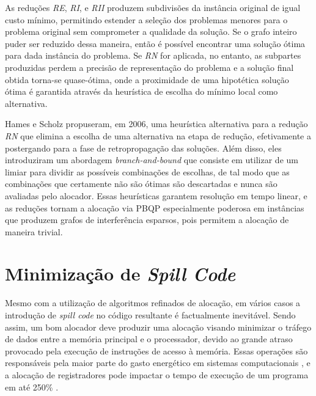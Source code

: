 \documentclass[
	12pt,				%
	openright,			%
	oneside,			%
	a4paper,			%
	tccpreliminar,			%
	]{ABNT-DC-UEL}
\begin{document}
\begin{enumerate}
\begin{figure}[H]
    \end{figure}
\end{enumerate}

As reduções \textit{RE}, \textit{RI}, e \textit{RII} produzem subdivisões da instância original de igual custo mínimo, permitindo estender a seleção dos problemas menores para o problema original sem comprometer a qualidade da solução. Se o grafo inteiro puder ser reduzido dessa maneira, então é possível encontrar uma solução ótima para dada instância do problema. Se \textit{RN} for aplicada, no entanto, as subpartes produzidas perdem a precisão de representação do problema e a solução final obtida torna-se quase-ótima, onde a proximidade de uma hipotética solução ótima é garantida através da heurística de escolha do mínimo local como alternativa.

Hames e Scholz \cite{hames:06} propuseram, em 2006, uma heurística alternativa para a redução \textit{RN} que elimina a escolha de uma alternativa na etapa de redução, efetivamente a postergando para a fase de retropropagação das soluções. Além disso, eles introduziram um abordagem \textit{branch-and-bound} que consiste em utilizar de um limiar para dividir as possíveis combinações de escolhas, de tal modo que as combinações que certamente não são ótimas são descartadas e nunca são avaliadas pelo alocador. Essas heurísticas garantem resolução em tempo linear, e as reduções tornam a alocação via PBQP especialmente poderosa em instâncias que produzem grafos de interferência esparsos, pois permitem a alocação de maneira trivial.

\chapter{Minimização de \textit{Spill Code}}

Mesmo com a utilização de algoritmos refinados de alocação, em vários casos a introdução de \textit{spill code} no código resultante é factualmente inevitável. Sendo assim, um bom alocador deve produzir uma alocação visando minimizar o tráfego de dados entre a memória principal e o processador, devido ao grande atraso provocado pela execução de instruções de acesso à memória. Essas operações são responsáveis pela maior parte do gasto energético em sistemas computacionais \cite{verma:06}, e a alocação de registradores pode impactar o tempo de execução de um programa em até 250\% \cite{pereira:08}.
\end{document}
